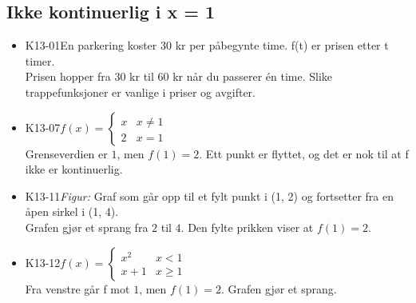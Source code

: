 \documentclass[11pt,a4paper]{article}
\begin{document}
\subsection*{Ikke kontinuerlig i x = 1}
\begin{itemize}[leftmargin=1.2em, itemsep=0.35em]
\item \textsf{\small K13-01}\quad En parkering koster 30 kr per påbegynte time. f(t) er prisen etter t timer.\\{\small\color{dempet}Prisen hopper fra $30$ kr til $60$ kr når du passerer én time. Slike trappefunksjoner er vanlige i priser og avgifter.}
\item \textsf{\small K13-07}\quad $f(x) = \begin{cases} x & x \neq 1 \\ 2 & x = 1 \end{cases}$\\{\small\color{dempet}Grenseverdien er $1$, men $f(1) = 2$. Ett punkt er flyttet, og det er nok til at f ikke er kontinuerlig.}
\item \textsf{\small K13-11}\quad \emph{Figur:} Graf som går opp til et fylt punkt i (1, 2) og fortsetter fra en åpen sirkel i (1, 4).\\{\small\color{dempet}Grafen gjør et sprang fra $2$ til $4$. Den fylte prikken viser at $f(1) = 2$.}
\item \textsf{\small K13-12}\quad $f(x) = \begin{cases} x^2 & x < 1 \\ x + 1 & x \geq 1 \end{cases}$\\{\small\color{dempet}Fra venstre går f mot $1$, men $f(1) = 2$. Grafen gjør et sprang.}
\end{itemize}
\end{document}
